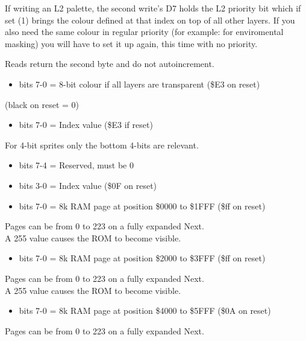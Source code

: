 If writing an L2 palette, the second write's D7 holds the L2 priority
bit which if set (1) brings the colour defined at that index on top of
all other layers. If you also need the same colour in regular priority
(for example: for enviromental masking) you will have to set it up
again, this time with no priority.

Reads return the second byte and do not autoincrement.

\begin{itemize}
\item bits 7-0 = 8-bit colour if all layers are transparent (\$E3 on
  reset)
\end{itemize}
(black on reset = 0)

\begin{itemize}
\item bits 7-0 = Index value (\$E3 if reset)
\end{itemize}
For 4-bit sprites only the bottom 4-bits are relevant.

\begin{itemize}
\item bits 7-4 = Reserved, must be 0
\item bits 3-0 = Index value (\$0F on reset)
\end{itemize}

\begin{itemize}
\item bits 7-0 = 8k RAM page at position \$0000 to \$1FFF (\$ff on
  reset)
\end{itemize}
Pages can be from 0 to 223 on a fully expanded Next.\\
A 255 value causes the ROM to become visible.

\begin{itemize}
\item bits 7-0 = 8k RAM page at position \$2000 to \$3FFF (\$ff on
  reset)
\end{itemize}
Pages can be from 0 to 223 on a fully expanded Next.\\
A 255 value causes the ROM to become visible.

\begin{itemize}
\item bits 7-0 = 8k RAM page at position \$4000 to \$5FFF (\$0A on
  reset)
\end{itemize}
Pages can be from 0 to 223 on a fully expanded Next.

